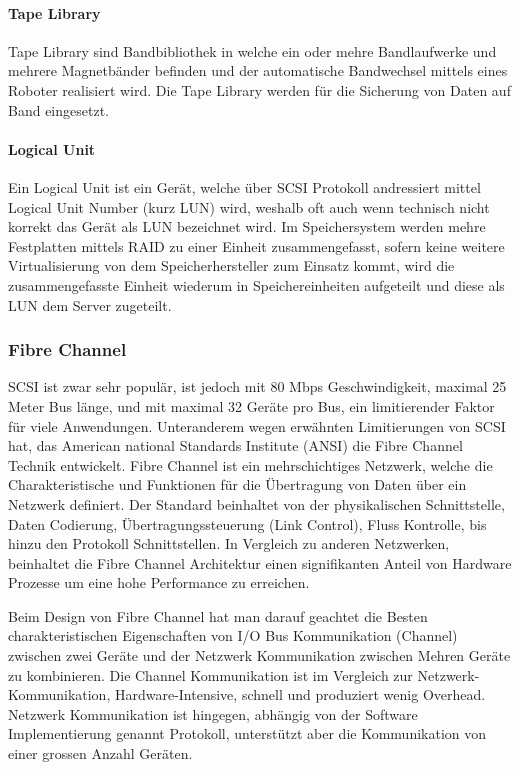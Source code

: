 \paragraph*{Tape Library}
Tape Library sind Bandbibliothek in welche ein oder mehre Bandlaufwerke und mehrere Magnetbänder befinden und der automatische Bandwechsel mittels eines Roboter realisiert wird. Die Tape Library werden für die Sicherung von Daten auf Band eingesetzt.

\paragraph*{Logical Unit}
Ein Logical Unit ist ein Gerät, welche über SCSI Protokoll andressiert mittel Logical Unit Number (kurz LUN) wird, weshalb oft auch wenn technisch nicht korrekt das Gerät als LUN bezeichnet wird. Im Speichersystem werden mehre Festplatten mittels RAID zu einer Einheit zusammengefasst, sofern keine weitere Virtualisierung von dem Speicherhersteller zum Einsatz kommt, wird die zusammengefasste Einheit wiederum in Speichereinheiten aufgeteilt und diese als LUN dem Server zugeteilt.\cite{SNIA2011}

\subsubsection{Fibre Channel}
SCSI ist zwar sehr populär, ist jedoch mit 80 Mbps Geschwindigkeit, maximal 25 Meter Bus länge, und mit maximal 32 Geräte pro Bus, ein limitierender Faktor für viele Anwendungen. Unteranderem wegen erwähnten Limitierungen von SCSI hat, das American national Standards Institute (ANSI) die Fibre Channel Technik entwickelt. Fibre Channel ist ein mehrschichtiges Netzwerk, welche die Charakteristische und Funktionen für die Übertragung von Daten über ein Netzwerk definiert. Der Standard beinhaltet von der physikalischen Schnittstelle, Daten Codierung, Übertragungssteuerung (Link Control), Fluss Kontrolle, bis hinzu den Protokoll Schnittstellen. In Vergleich zu anderen Netzwerken, beinhaltet die Fibre Channel Architektur einen signifikanten Anteil von Hardware Prozesse um eine hohe Performance zu erreichen.\cite{Gupta2002}\cite{Christopher2009}

Beim Design von Fibre Channel hat man darauf geachtet die Besten charakteristischen Eigenschaften von I/O Bus Kommunikation (Channel) zwischen zwei Geräte und der Netzwerk Kommunikation zwischen Mehren Geräte zu kombinieren. Die Channel Kommunikation ist im Vergleich zur Netzwerk-Kommunikation, Hardware-Intensive, schnell und produziert wenig Overhead. Netzwerk Kommunikation ist hingegen, abhängig von der Software Implementierung genannt Protokoll, unterstützt aber die Kommunikation von einer grossen Anzahl Geräten.

